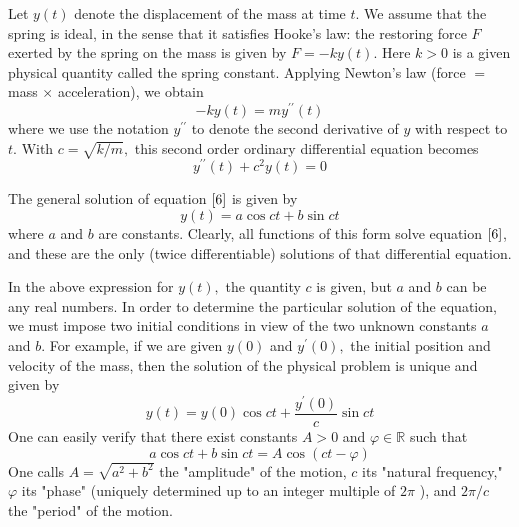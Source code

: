 \documentclass[12pt]{book}
\theoremstyle{definition}\newtheorem{dfn}{Définition}[chapter]
\theoremstyle{plain}\newtheorem{thm}{Théorème}[chapter]
\theoremstyle{plain}\newtheorem{prp}{Proposition}[chapter]
\theoremstyle{plain}\newtheorem{lem}{\bf Lemme}[chapter]
\theoremstyle{plain}\newtheorem{axm}{\bf Axiome}[chapter]
\theoremstyle{plain}\newtheorem{lmm}{\bf Lemme}[chapter]
\theoremstyle{plain}\newtheorem{exm}{\bf Example}[chapter]
\theoremstyle{plain}\newtheorem{cor}{\bf Corollaire}[chapter]
\theoremstyle{remark}\newtheorem{rem}{Remarque}[chapter]
\begin{document}
 Let $y(t)$ denote the displacement of the mass at time $t .$ We assume that the spring is ideal, in the sense that it satisfies Hooke's law: the restoring force $F$ exerted by the spring on the mass is given by $F=-k y(t)$. Here $k>0$ is a given physical quantity called the spring constant. Applying Newton's law (force $=$ mass $\times$ acceleration), we obtain
 $$
 -k y(t)=m y^{\prime \prime}(t)
 $$
 where we use the notation $y^{\prime \prime}$ to denote the second derivative of $y$ with respect to $t .$ With $c=\sqrt{k / m},$ this second order ordinary differential equation becomes
\begin{equation}
 y^{\prime \prime}(t)+c^{2} y(t)=0\label{6}
\end{equation}

 The general solution of equation $\ref{6}$ is given by
 $$
 y(t)=a \cos c t+b \sin c t
 $$
 where $a$ and $b$ are constants. Clearly, all functions of this form solve equation $\ref{6}$, and these are the only (twice differentiable) solutions of that differential equation.
 
 In the above expression for $y(t),$ the quantity $c$ is given, but $a$ and $b$ can be any real numbers. In order to determine the particular solution of the equation, we must impose two initial conditions in view of the two unknown constants $a$ and $b$. For example, if we are given $y(0)$ and $y^{\prime}(0),$ the initial position and velocity of the mass, then the solution of the physical problem is unique and given by
$$
y(t)=y(0) \cos c t+\frac{y^{\prime}(0)}{c} \sin c t
$$
One can easily verify that there exist constants $A>0$ and $\varphi \in \mathbb{R}$ such that
$$
a \cos c t+b \sin c t=A \cos (c t-\varphi)
$$
One calls $A=\sqrt{a^{2}+b^{2}}$ the "amplitude" of the motion, $c$ its "natural frequency," $\varphi$ its "phase" (uniquely determined up to an integer multiple of $2 \pi$ ), and $2 \pi / c$ the "period" of the motion.
\end{document}
